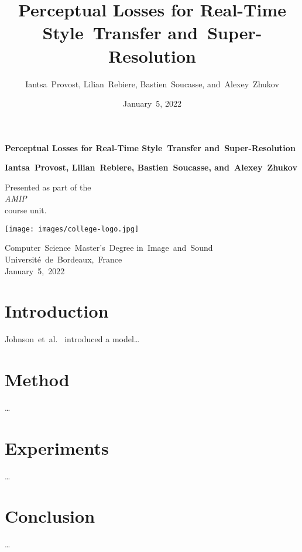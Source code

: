 \documentclass{article}
\title{Perceptual Losses for Real-Time Style~Transfer and~Super-Resolution}
\author{Iantsa~Provost, Lilian~Rebiere, Bastien~Soucasse, and~Alexey~Zhukov}
\date{January~5, 2022}
\begin{document}
{
    \begin{titlepage}
        \begin{center}
            \vspace*{1.5cm}
            
            \Large
            
            \textbf{Perceptual Losses for Real-Time Style~Transfer and~Super-Resolution}
            
            \vspace{.5cm}
            
            \vspace{1.5cm}
            
            \large
            
            \textbf{Iantsa~Provost, Lilian~Rebiere, Bastien~Soucasse, and~Alexey~Zhukov}
            
            \vfill
            
            \normalsize
            
            Presented as part of the\\
            \textit{AMIP}\\
            course unit.
            
            \vspace{1.5cm}
            
            \texttt{[image: images/college-logo.jpg]}
            
            Computer~Science~Master's~Degree in~Image~and~Sound\\
            Université~de~Bordeaux,~France\\
            January~5,~2022
        \end{center}
    \end{titlepage}
    \newpage
    \setcounter{page}{2}
}

{
    \hypersetup{linkcolor=black}
    \tableofcontents
    \newpage
}

{
    \section{Introduction}
    \label{sec:introduction}

    Johnson~et~al.~\cite{https://doi.org/10.48550/arxiv.1603.08155} introduced a model…
}

{
    \section{Method}
    \label{sec:method}

    …
}

{
    \section{Experiments}
    \label{sec:experiments}

    …
}

{
    \section{Conclusion}
    \label{sec:conclusion}

    …
}

{
    
}
\end{document}
